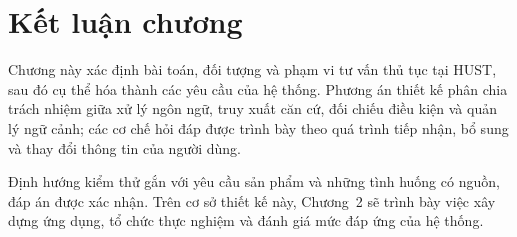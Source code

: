 \section{Kết luận chương}
\label{sec:ket-chuong}
Chương này xác định bài toán, đối tượng và phạm vi tư vấn thủ tục tại HUST,
sau đó cụ thể hóa thành các yêu cầu của hệ thống. Phương án thiết kế phân
chia trách nhiệm giữa xử lý ngôn ngữ, truy xuất căn cứ, đối chiếu điều kiện
và quản lý ngữ cảnh; các cơ chế hỏi đáp được trình bày theo quá trình tiếp
nhận, bổ sung và thay đổi thông tin của người dùng.

Định hướng kiểm thử gắn với yêu cầu sản phẩm và những tình huống có nguồn,
đáp án được xác nhận. Trên cơ sở thiết kế này, Chương~2 sẽ trình bày việc
xây dựng ứng dụng, tổ chức thực nghiệm và đánh giá mức đáp ứng của hệ thống.
